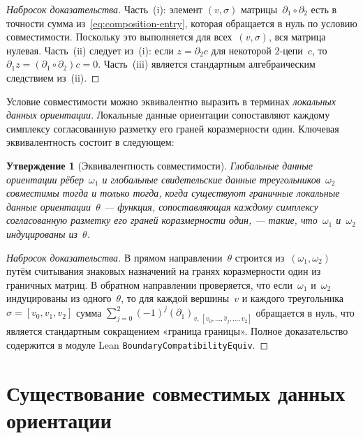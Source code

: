 \documentclass[11pt,a4paper]{article}
\theoremstyle{plain}
\newtheorem{proposition}[theorem]{Утверждение}
\theoremstyle{definition}
\theoremstyle{remark}
\begin{document}
\begin{proof}[Набросок доказательства]
Часть~(i): элемент $(v, \sigma)$ матрицы~$\partial_1 \circ \partial_2$
есть в точности сумма из~\eqref{eq:composition-entry}, которая обращается
в нуль по условию совместимости. Поскольку это выполняется для
всех~$(v,\sigma)$, вся матрица нулевая. Часть~(ii) следует из~(i): если
$z = \partial_2 c$ для некоторой $2$-цепи~$c$, то
$\partial_1 z = (\partial_1 \circ \partial_2) c = 0$.
Часть~(iii) является стандартным алгебраическим следствием из~(ii).
\end{proof}

Условие совместимости можно эквивалентно выразить в терминах
\emph{локальных данных ориентации}. Локальные данные ориентации
сопоставляют каждому симплексу согласованную разметку его граней
коразмерности один. Ключевая эквивалентность состоит в следующем:

\begin{proposition}[Эквивалентность совместимости]
\label{prop:compat-equiv}
Глобальные данные ориентации рёбер~$\omega_1$ и глобальные свидетельские
данные треугольников~$\omega_2$ совместимы тогда и только тогда, когда
существуют \emph{граничные локальные данные ориентации}~$\theta$ ---
функция, сопоставляющая каждому симплексу согласованную разметку его
граней коразмерности один, --- такие, что~$\omega_1$ и~$\omega_2$
индуцированы из~$\theta$.
\end{proposition}

\begin{proof}[Набросок доказательства]
В прямом направлении~$\theta$ строится из~$(\omega_1, \omega_2)$ путём
считывания знаковых назначений на гранях коразмерности один из граничных
матриц. В обратном направлении проверяется, что если~$\omega_1$
и~$\omega_2$ индуцированы из одного~$\theta$, то для каждой вершины~$v$
и каждого треугольника~$\sigma = [v_0, v_1, v_2]$ сумма
$\sum_{j=0}^{2} (-1)^j (\partial_1)_{v,\, [v_0, \ldots, \hat{v}_j,
\ldots, v_2]}$ обращается в нуль, что является стандартным сокращением
«граница границы».
Полное доказательство содержится в модуле Lean \texttt{BoundaryCompatibilityEquiv}.
\end{proof}

\section{Существование совместимых данных ориентации}
\label{sec:existence}
\end{document}

